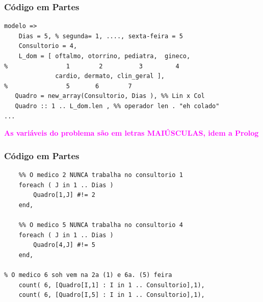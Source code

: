 \documentclass{beamer}
\begin{document}
\begin{frame}[fragile] 

\frametitle{Código em Partes}

\begin{footnotesize}
\begin{verbatim}
modelo => 
    Dias = 5, % segunda= 1, ...., sexta-feira = 5
    Consultorio = 4,
    L_dom = [ oftalmo, otorrino, pediatra,  gineco, 
%                1        2          3         4
              cardio, dermato, clin_geral ],
%                5       6        7
   Quadro = new_array(Consultorio, Dias ), %% Lin x Col
   Quadro :: 1 .. L_dom.len , %% operador len . "eh colado"
...
\end{verbatim}

\end{footnotesize}

{\bf \textcolor{magenta}{As variáveis do problema são em letras MAIÚSCULAS, idem a Prolog}}   
    
\end{frame}
\begin{frame}[fragile] 

\frametitle{Código em Partes}

\begin{footnotesize}
\begin{verbatim}
    %% O medico 2 NUNCA trabalha no consultorio 1
    foreach ( J in 1 .. Dias ) 
        Quadro[1,J] #!= 2
    end,
    
    %% O medico 5 NUNCA trabalha no consultorio 4
    foreach ( J in 1 .. Dias ) 
        Quadro[4,J] #!= 5
    end,

% O medico 6 soh vem na 2a (1) e 6a. (5) feira
    count( 6, [Quadro[I,1] : I in 1 .. Consultorio],1),
    count( 6, [Quadro[I,5] : I in 1 .. Consultorio],1),
\end{verbatim}
\end{footnotesize}
    
\end{frame}
\end{document}
